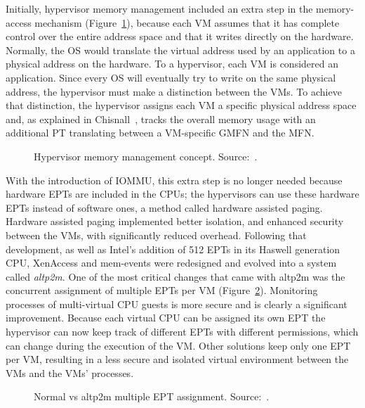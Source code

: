 \par Initially, hypervisor memory management included an extra step in the memory-access mechanism (Figure~\ref{fig:hypmm}), because each \ac{VM} assumes that it has complete control over the entire address space and that it writes directly on the hardware. Normally, the \ac{OS} would translate the virtual address used by an application to a physical address on the hardware. To a hypervisor, each \ac{VM} is considered an application. Since every \ac{OS} will eventually try to write on the same physical address, the hypervisor must make a distinction between the \ac{VM}s. To achieve that distinction, the hypervisor assigns each \ac{VM} a specific physical address space and, as explained in Chisnall~\cite{chisnall2008definitive}, tracks the overall memory usage with an additional \ac{PT} translating between a \ac{VM}-specific \ac{GMFN} and the \ac{MFN}.

\begin{figure}[ht]
	\centering
	
	\caption{Hypervisor memory management concept. Source:~\cite{chisnall2008definitive}.}
	\label{fig:hypmm}
\end{figure}

\par With the introduction of \ac{IOMMU}, this extra step is no longer needed because hardware \acp{EPT} are included in the \ac{CPU}s; the hypervisors can use these hardware \acp{EPT} instead of software ones, a method called hardware assisted paging. Hardware assisted paging implemented better isolation, and enhanced security between the \acp{VM}, with significantly reduced overhead. Following that development, as well as Intel's addition of 512 \acp{EPT} in its Haswell generation \ac{CPU}, XenAccess and mem-events were redesigned and evolved into a system called \emph{altp2m}. One of the most critical changes that came with altp2m was the concurrent assignment of multiple \ac{EPT}s per \ac{VM} (Figure~\ref{fig:ept}). Monitoring processes of multi-virtual \ac{CPU} guests is more secure and is clearly a significant improvement. Because each virtual \ac{CPU} can be assigned its own \ac{EPT} the hypervisor can now keep track of different \acp{EPT} with different permissions, which can change during the execution of the \ac{VM}. Other solutions keep only one \ac{EPT} per \ac{VM}, resulting in a less secure and isolated virtual environment between the \acp{VM} and the \acp{VM}' processes.

\begin{figure}[ht]
	\centering
	\scalebox{0.95}{}
	\caption{Normal vs altp2m multiple \ac{EPT} assignment. Source:~\cite{xen1}.}
	\label{fig:ept}
\end{figure}

